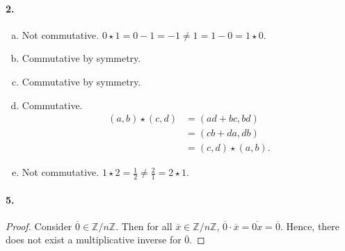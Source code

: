 \documentclass{article}
\begin{document}
\paragraph{2.}
\begin{enumerate}[(a)]
  \item Not commutative. $0 \star 1 = 0 - 1 = -1 \neq 1 = 1 - 0 = 1 \star 0$.
  \item Commutative by symmetry.
  \item Commutative by symmetry.
  \item Commutative. \begin{align*}
      (a, b) \star (c, d)
      &= (ad + bc, bd) \\
      &= (cb + da, db) \\
      &= (c, d) \star (a, b).
    \end{align*}
  \item Not commutative. $1 \star 2 = \frac{1}{2} \neq \frac{2}{1} = 2 \star 1$.
\end{enumerate}

\paragraph{5.}
\begin{proof}
  Consider $\overline{0} \in \mathbb{Z}/n\mathbb{Z}$. Then for all $\overline{x}
  \in \mathbb{Z}/n\mathbb{Z}$, $\overline{0} \cdot \overline{x} = \overline{0x}
  = \overline{0}$. Hence, there does not exist a multiplicative inverse for
  $\overline{0}$.
\end{proof}
\end{document}
